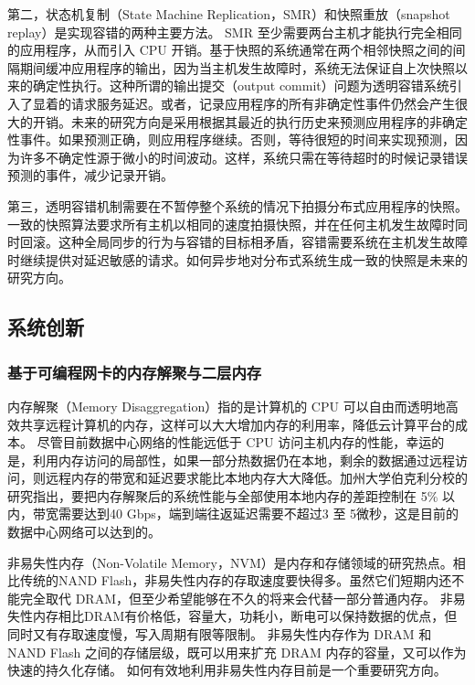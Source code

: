 第二，状态机复制（State Machine Replication，SMR）和快照重放（snapshot replay）是实现容错的两种主要方法。 SMR 至少需要两台主机才能执行完全相同的应用程序，从而引入 CPU 开销。基于快照的系统通常在两个相邻快照之间的间隔期间缓冲应用程序的输出，因为当主机发生故障时，系统无法保证自上次快照以来的确定性执行。这种所谓的输出提交（output commit）问题为透明容错系统引入了显着的请求服务延迟。或者，记录应用程序的所有非确定性事件仍然会产生很大的开销。未来的研究方向是采用根据其最近的执行历史来预测应用程序的非确定性事件。如果预测正确，则应用程序继续。否则，等待很短的时间来实现预测，因为许多不确定性源于微小的时间波动。这样，系统只需在等待超时的时候记录错误预测的事件，减少记录开销。

第三，透明容错机制需要在不暂停整个系统的情况下拍摄分布式应用程序的快照。一致的快照算法要求所有主机以相同的速度拍摄快照，并在任何主机发生故障时同时回滚。这种全局同步的行为与容错的目标相矛盾，容错需要系统在主机发生故障时继续提供对延迟敏感的请求。如何异步地对分布式系统生成一致的快照是未来的研究方向。


\subsection{系统创新}
\label{future:system}

\subsubsection{基于可编程网卡的内存解聚与二层内存}
\label{future:second-tier-memory}

内存解聚（Memory Disaggregation）指的是计算机的 CPU 可以自由而透明地高效共享远程计算机的内存，这样可以大大增加内存的利用率，降低云计算平台的成本。
尽管目前数据中心网络的性能远低于 CPU 访问主机内存的性能，幸运的是，利用内存访问的局部性，如果一部分热数据仍在本地，剩余的数据通过远程访问，则远程内存的带宽和延迟要求能比本地内存大大降低。加州大学伯克利分校的研究指出，要把内存解聚后的系统性能与全部使用本地内存的差距控制在 5\% 以内，带宽需要达到40 Gbps，端到端往返延迟需要不超过3 至 5微秒，这是目前的数据中心网络可以达到的。

非易失性内存（Non-Volatile Memory，NVM）是内存和存储领域的研究热点。相比传统的NAND Flash，非易失性内存的存取速度要快得多。虽然它们短期内还不能完全取代 DRAM，但至少希望能够在不久的将来会代替一部分普通内存。
非易失性内存相比DRAM有价格低，容量大，功耗小，断电可以保持数据的优点，但同时又有存取速度慢，写入周期有限等限制。
非易失性内存作为 DRAM 和 NAND Flash 之间的存储层级，既可以用来扩充 DRAM 内存的容量，又可以作为快速的持久化存储。
如何有效地利用非易失性内存目前是一个重要研究方向。

